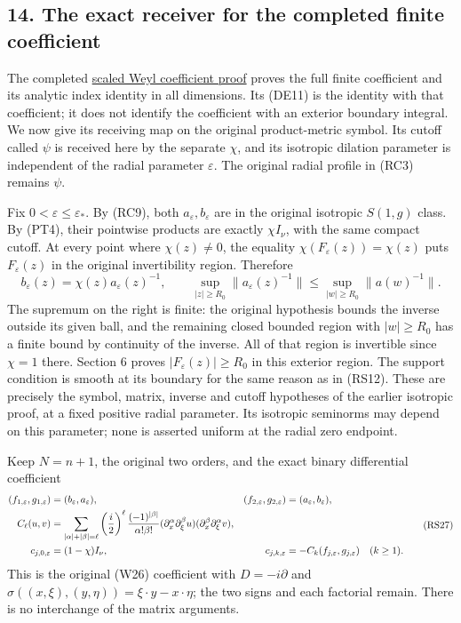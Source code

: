 \documentclass[
  11pt,
]{article}
\begin{document}
\subsection{14. The exact receiver for the completed finite
coefficient}\label{the-exact-receiver-for-the-completed-finite-coefficient}

The completed
\href{scaled-weyl-index-degree.pdf\#section*.82}{scaled
Weyl coefficient proof} proves the full finite coefficient and its
analytic index identity in all dimensions. Its (DE11) is the identity
with that coefficient; it does not identify the coefficient with an
exterior boundary integral. We now give its receiving map on the
original product-metric symbol. Its cutoff called \(\psi\) is received
here by the separate \(\chi\), and its isotropic dilation parameter is
independent of the radial parameter \(\varepsilon\). The original radial
profile in (RC3) remains \(\psi\).

Fix \(0<\varepsilon\leq\varepsilon_*\). By (RC9), both
\(a_\varepsilon,b_\varepsilon\) are in the original isotropic \(S(1,g)\)
class. By (PT4), their pointwise products are exactly \(\chi I_\nu\),
with the same compact cutoff. At every point where \(\chi(z)\ne0\), the
equality \(\chi(F_\varepsilon(z))=\chi(z)\) puts \(F_\varepsilon(z)\) in
the original invertibility region. Therefore \[
 b_\varepsilon(z)=\chi(z)a_\varepsilon(z)^{-1},
 \qquad
 \sup_{|z|\geq R_0}\|a_\varepsilon(z)^{-1}\|
    \leq\sup_{|w|\geq R_0}\|a(w)^{-1}\| .
 \tag{RS26}
\] The supremum on the right is finite: the original hypothesis bounds
the inverse outside its given ball, and the remaining closed bounded
region with \(|w|\geq R_0\) has a finite bound by continuity of the
inverse. All of that region is invertible since \(\chi=1\) there.
Section 6 proves \(|F_\varepsilon(z)|\geq R_0\) in this exterior region.
The support condition is smooth at its boundary for the same reason as
in (RS12). These are precisely the symbol, matrix, inverse and cutoff
hypotheses of the earlier isotropic proof, at a fixed positive radial
parameter. Its isotropic seminorms may depend on this parameter; none is
asserted uniform at the radial zero endpoint.

Keep \(N=n+1\), the original two orders, and the exact binary
differential coefficient {\footnotesize\let\split\aligned\let\endsplit\endaligned
\[
 \begin{split}
 (f_{1,\varepsilon},g_{1,\varepsilon})
     &=(b_\varepsilon,a_\varepsilon),&
 (f_{2,\varepsilon},g_{2,\varepsilon})
     &=(a_\varepsilon,b_\varepsilon),\\
 C_\ell(u,v)
 &=\sum_{|\alpha|+|\beta|=\ell}
       \left(\frac i2\right)^\ell
       \frac{(-1)^{|\beta|}}{\alpha!\beta!}
       (\partial_x^\alpha\partial_\xi^\beta u)
       (\partial_x^\beta\partial_\xi^\alpha v),\\
 c_{j,0,\varepsilon}&=(1-\chi)I_\nu,&
 c_{j,k,\varepsilon}&=-C_k(f_{j,\varepsilon},g_{j,\varepsilon})
                                      \quad(k\geq1).
 \end{split}
 \tag{RS27}
\]
} This is the original (W26) coefficient with \(D=-i\partial\) and
\(\sigma((x,\xi),(y,\eta))=\xi\cdot y-x\cdot\eta\); the two signs and
each factorial remain. There is no interchange of the matrix arguments.
\end{document}
